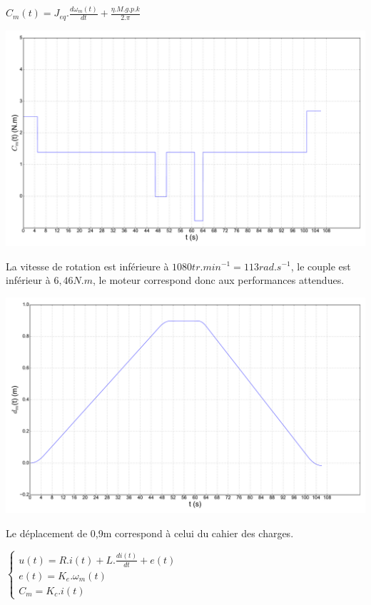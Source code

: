 
$C_m(t)=J_{eq}.\frac{d\omega_m(t)}{dt}+\frac{\eta.M.g.p.k}{2.\pi}$

\begin{center}
 \includegraphics[width=0.9\linewidth]{img/couple_cor}
\end{center}


La vitesse de rotation est inférieure à $1080tr.min^{-1}=113rad.s^{-1}$, le couple est inférieur à $6,46N.m$, le moteur correspond donc aux performances attendues.


\begin{center}
 \includegraphics[width=0.9\linewidth]{img/deplacement_cor}
\end{center}


Le déplacement de 0,9m correspond à celui du cahier des charges.


$\left\{\begin{array}{l}
u(t)=R.i(t)+L.\frac{di(t)}{dt}+e(t) \\
e(t)=K_e.\omega_m(t) \\
C_m=K_c.i(t)
\end{array}\right.$

